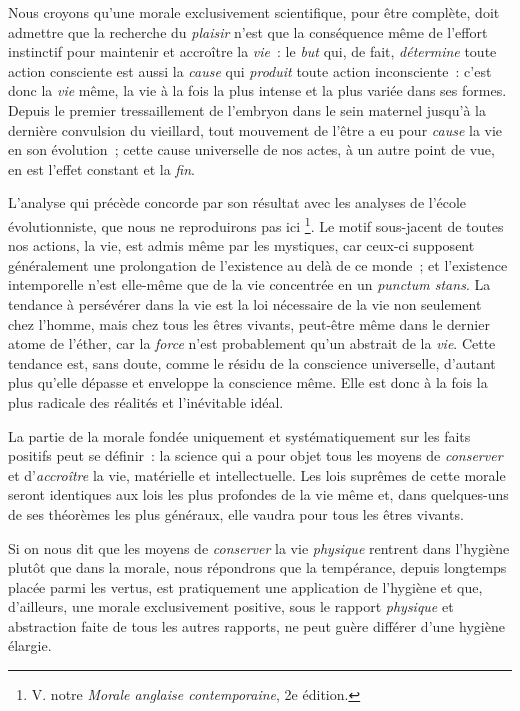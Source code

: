 \documentclass[french,twoside]{book} %
\begin{document}
Nous croyons qu’une morale exclusivement scientifique, pour être complète, doit admettre que la recherche du \emph{plaisir} n’est que la conséquence même de l’effort instinctif pour maintenir et accroître la \emph{vie} : le \emph{but} qui, de fait, \emph{détermine} toute action consciente est aussi la \emph{cause} qui \emph{produit} toute action inconsciente : c’est donc la \emph{vie} même, la vie à la fois la plus intense et la plus variée dans ses formes. Depuis le premier tressaillement de l’embryon dans le sein maternel jusqu’à la dernière convulsion du vieillard, tout mouvement de l’être a eu pour \emph{cause} la vie en son évolution ; cette cause universelle de nos actes, à un autre point de vue, en est l’effet constant et la \emph{fin}.\par
L’analyse qui précède concorde par son résultat avec les analyses de l’école évolutionniste, que nous ne reproduirons pas ici \footnote{V. notre \emph{Morale anglaise contemporaine}, 2e édition.}. Le motif sous-jacent de toutes nos actions, la vie, est admis même par les mystiques, car ceux-ci supposent généralement une prolongation de l’existence au delà de ce monde ; et l’existence intemporelle n’est elle-même que de la vie concentrée en un \emph{punctum stans}. La tendance à persévérer dans la vie est la loi nécessaire de la vie non seulement chez l’homme, mais chez tous les êtres vivants, peut-être même dans le dernier atome de l’éther, car la \emph{force} n’est probablement qu’un abstrait de la \emph{vie}. Cette tendance est, sans doute, comme le résidu de la conscience universelle, d’autant plus qu’elle dépasse et enveloppe la conscience même. Elle est donc à la fois la plus radicale des réalités et l’inévitable idéal.\par
La partie de la morale fondée uniquement et systématiquement sur les faits positifs peut se définir : la science qui a pour objet tous les moyens de \emph{conserver} et d’\emph{accroître} la vie, matérielle et intellectuelle. Les lois suprêmes de cette morale seront identiques aux lois les plus profondes de la vie même et, dans quelques-uns de ses théorèmes les plus généraux, elle vaudra pour tous les êtres vivants.\par
Si on nous dit que les moyens de \emph{conserver} la vie \emph{physique} rentrent dans l’hygiène plutôt que dans la morale, nous répondrons que la tempérance, depuis longtemps placée parmi les vertus, est pratiquement une application de l’hygiène et que, d’ailleurs, une morale exclusivement positive, sous le rapport \emph{physique} et abstraction faite de tous les autres rapports, ne peut guère différer d’une hygiène élargie.\par
\end{document}
